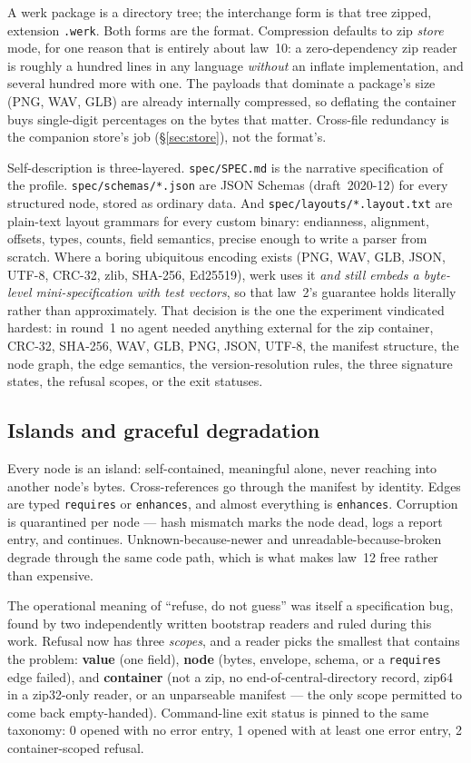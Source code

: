 \documentclass[10pt,twocolumn,letterpaper]{article}
\newcommand{\code}[1]{\texttt{\small #1}}
\begin{document}
A werk package is a directory tree; the interchange form is that tree zipped,
extension \code{.werk}. Both forms are the format. Compression defaults to zip
\emph{store} mode, for one reason that is entirely about law~10: a
zero-dependency zip reader is roughly a hundred lines in any language
\emph{without} an inflate implementation, and several hundred more with one. The
payloads that dominate a package's size (PNG, WAV, GLB) are already internally
compressed, so deflating the container buys single-digit percentages on the bytes
that matter. Cross-file redundancy is the companion store's job (\S\ref{sec:store}),
not the format's.

Self-description is three-layered. \code{spec/SPEC.md} is the narrative
specification of the profile. \code{spec/schemas/*.json} are JSON Schemas
(draft~2020-12) for every structured node, stored as ordinary data. And
\code{spec/layouts/*.layout.txt} are plain-text layout grammars for every custom
binary: endianness, alignment, offsets, types, counts, field semantics, precise
enough to write a parser from scratch. Where a boring ubiquitous encoding exists
(PNG, WAV, GLB, JSON, UTF-8, CRC-32, zlib, SHA-256, Ed25519), werk uses it
\emph{and still embeds a byte-level mini-specification with test vectors}, so
that law~2's guarantee holds literally rather than approximately. That decision
is the one the experiment vindicated hardest: in round~1 no agent needed anything
external for the zip container, CRC-32, SHA-256, WAV, GLB, PNG, JSON, UTF-8, the
manifest structure, the node graph, the edge semantics, the version-resolution
rules, the three signature states, the refusal scopes, or the exit statuses.

\subsection{Islands and graceful degradation}

Every node is an island: self-contained, meaningful alone, never reaching into
another node's bytes. Cross-references go through the manifest by identity. Edges
are typed \code{requires} or \code{enhances}, and almost everything is
\code{enhances}. Corruption is quarantined per node --- hash mismatch marks the
node dead, logs a report entry, and continues. Unknown-because-newer and
unreadable-because-broken degrade through the same code path, which is what makes
law~12 free rather than expensive.

The operational meaning of ``refuse, do not guess'' was itself a specification
bug, found by two independently written bootstrap readers and ruled during this
work. Refusal now has three \emph{scopes}, and a reader picks the smallest that
contains the problem: \textbf{value} (one field), \textbf{node} (bytes, envelope,
schema, or a \code{requires} edge failed), and \textbf{container} (not a zip, no
end-of-central-directory record, zip64 in a zip32-only reader, or an unparseable
manifest --- the only scope permitted to come back empty-handed). Command-line
exit status is pinned to the same taxonomy: 0 opened with no error entry, 1
opened with at least one error entry, 2 container-scoped refusal.
\end{document}
